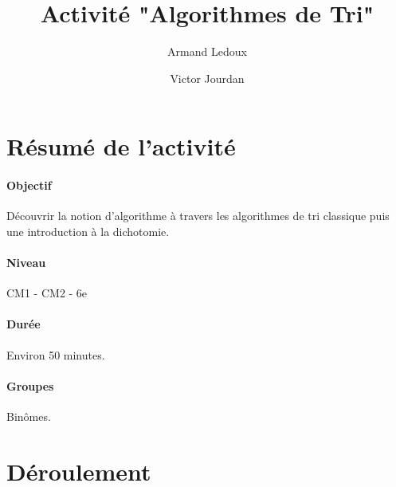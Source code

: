 \documentclass[a4paper,11pt]{article}%
\title{Activité "Algorithmes de Tri"}%
\author{Armand Ledoux \and Victor Jourdan}%
\date{}%
\begin{document}
%

\maketitle%

\section{Résumé de l'activité}

\paragraph{Objectif}
Découvrir la notion d'algorithme à travers les algorithmes de tri classique puis une introduction à la dichotomie.

\paragraph{Niveau}
CM1 - CM2 - 6e

\paragraph{Durée}
Environ 50 minutes.

\paragraph{Groupes}
Binômes.



\section{Déroulement}
\end{document}
